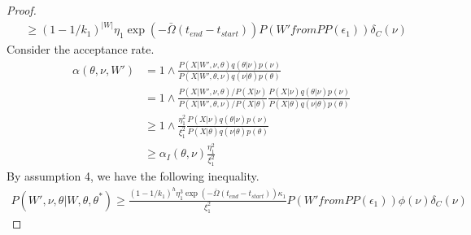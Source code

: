 \begin{proof}
\begin{align*}
& \geq (1 - 1/k_1)^{|W|}\eta_1 \exp(-\bar{\Omega}(t_{end} - t_{start})) P(W' from PP(\epsilon_1))\delta_C(\nu)
\end{align*}
Consider the acceptance rate.
\begin{align*}
\alpha(\theta, \nu, W') &= 1 \wedge \frac{P(X | W', \nu, \theta) q(\theta|\nu)p(\nu)}{P(X | W', \theta, \nu)q(\nu|\theta)p(\theta)}\\
&= 1 \wedge \frac{P(X|W', \nu, \theta) / P(X|\nu)}{P(X|W', \theta, \nu) / P(X|\theta)} \frac{P(X | \nu) q(\theta|\nu)p(\nu)}{P(X | \theta)q(\nu|\theta)p(\theta)}\\
& \geq 1 \wedge \frac{\eta_1^2}{\xi_1^2} 	\frac{P(X | \nu) q(\theta|\nu)p(\nu)}{P(X | \theta)q(\nu|\theta)p(\theta)}\\
& \geq \alpha_I(\theta, \nu)\frac{\eta_1^2}{\xi_1^2}
\end{align*}
By assumption 4, we have the following inequality.
\begin{align*}
P(W', \nu, \theta | W, \theta, \theta^*) \geq \frac{(1 - 1/k_1)^{h} \eta_1^3 \exp(-\bar{\Omega}(t_{end} - t_{start}))\kappa_1}{\xi_1^2} P(W' from PP(\epsilon_1))\phi(\nu)\delta_C(\nu)
\end{align*}
\end{proof}


